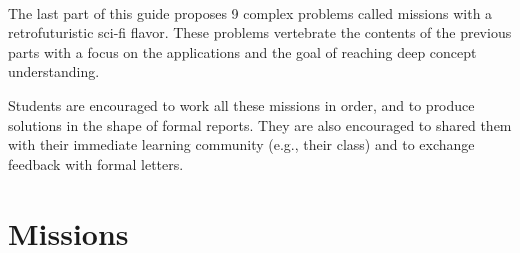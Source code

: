 \ \\[-9cm]
The last part of this guide proposes 9 complex problems called missions
with a retrofuturistic sci-fi flavor. These problems vertebrate the contents of the previous
parts with a focus on the applications and the goal of reaching deep concept understanding.

Students are encouraged to work all these missions in order, and to produce solutions
in the shape of formal reports. They are also encouraged to shared them with their
immediate learning community (e.g., their class) and to exchange feedback
with formal letters.


\chapter{Missions}

